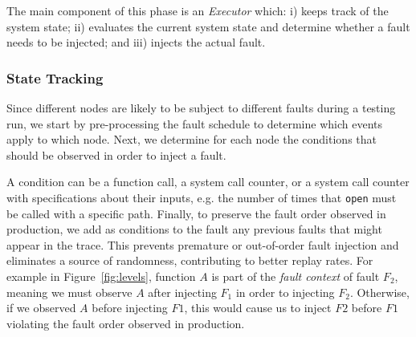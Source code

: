 The main component of this phase is an \emph{Executor} which:
i) keeps track of the system state;
ii) evaluates the current system state and determine whether a fault needs to be injected; and
iii) injects the actual fault.

\subsubsection{State Tracking}
\label{sec:repr:state}

Since different nodes are likely to be subject to different faults during a testing run, we start by pre-processing the fault schedule to determine which events apply to which node.
Next, we determine for each node the conditions that should be observed in order to inject a fault.

A condition can be a function call, a system call counter, or a system call counter with specifications about their inputs, e.g. the number of times that \texttt{open} must be called with a specific path.
Finally, to preserve the fault order observed in production, we add as conditions to the fault any previous faults that might appear in the trace.
This prevents premature or out-of-order fault injection and eliminates a source of randomness, contributing to better replay rates.
For example in Figure~\ref{fig:levels}, function $A$ is part of the \emph{fault context} of fault $F_2$, meaning we must observe $A$ after injecting $F_1$ in order to injecting $F_2$.
Otherwise, if we observed $A$ before injecting $F1$, this would cause us to inject $F2$ before $F1$ violating the fault order observed in production.




